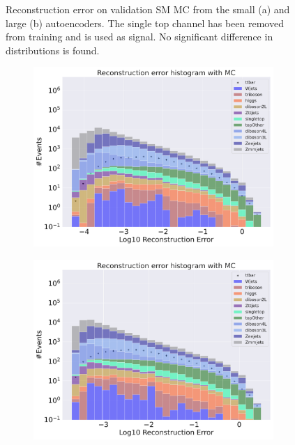 \begin{figure}[H]
\begin{subfigure}{.45\textwidth}
        \caption{ }
        \label{fig:ae_big_singletop}
    \end{subfigure}
    \hfill
    \caption[AE | Reconstruction error using Singletop channel as signal]{Reconstruction error on validation SM MC from the small (a) and large (b) autoencoders. The single top channel has been removed from training and 
    is used as signal. No significant difference in distributions is found.  } 
    \label{fig:ae_big_channel_2}
\end{figure}

\begin{figure}[H]
    \centering
    \begin{subfigure}{.45\textwidth}
        \includegraphics[width=\textwidth]{Figures/AE_testing/small/b_data_recon_big_rm3_feats_sig_ttbar.pdf}
        \caption{}
        \label{fig:ae_small_ttbar}
    \end{subfigure}
    \hfill 
    \begin{subfigure}{.45\textwidth}
        \includegraphics[width=\textwidth]{Figures/AE_testing/big/b_data_recon_big_rm3_feats_sig_ttbar.pdf}

\end{subfigure}
\end{figure}
